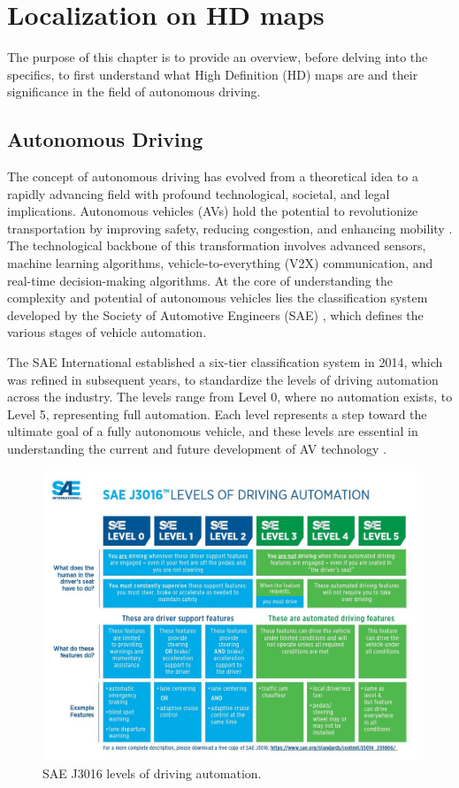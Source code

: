 \NoBgThispage
\chapter{Localization on HD maps}
The purpose of this chapter is to provide an overview, before delving into the specifics, to first understand what High Definition (HD) maps are and their significance in the field of autonomous driving.

\section{Autonomous Driving}
The concept of autonomous driving has evolved from a theoretical idea to a rapidly advancing field with profound technological, societal, and legal implications. Autonomous vehicles (AVs) hold the potential to revolutionize transportation by improving safety, reducing congestion, and enhancing mobility \cite{9695620}. The technological backbone of this transformation involves advanced sensors, machine learning algorithms, vehicle-to-everything (V2X) communication, and real-time decision-making algorithms. At the core of understanding the complexity and potential of autonomous vehicles lies the classification system developed by the Society of Automotive Engineers (SAE) \cite{sae2021}, which defines the various stages of vehicle automation.

The SAE International established a six-tier classification system in 2014, which was refined in subsequent years, to standardize the levels of driving automation across the industry. The levels range from Level 0, where no automation exists, to Level 5, representing full automation. Each level represents a step toward the ultimate goal of a fully autonomous vehicle, and these levels are essential in understanding the current and future development of AV technology \cite{9881892}.

\begin{figure}
    \centering
    \includegraphics[width=1\linewidth]{LateX/figs/ca3qj6bg.png}
    \caption{SAE J3016 levels of driving automation.}
    \label{fig:sae_levels_of_automation}
\end{figure}

